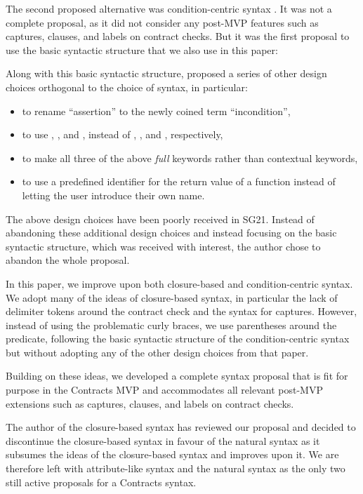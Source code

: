 The second proposed alternative was condition-centric syntax \cite{P2737R0}. It was not a complete proposal, as it did not consider any post-MVP features such as captures,  clauses, and labels on contract checks. But it was the first proposal to use the basic syntactic structure that we also use in this paper:

\phantom{~~~}

Along with this basic syntactic structure, \cite{P2737R0} proposed a series of other design choices orthogonal to the choice of syntax, in particular:
\begin{itemize}
\item to rename ``assertion'' to the newly coined term ``incondition'',
\item to use , , and , instead of , , and , respectively,
\item to make all three of the above \emph{full} keywords rather than contextual keywords,
\item to use a predefined identifier  for the return value of a function instead of letting the user introduce their own name.
\end{itemize}
The above design choices have been poorly received in SG21. Instead of abandoning these additional design choices and instead focusing on the basic syntactic structure, which was received with interest, the author chose to abandon the whole proposal.

In this paper, we improve upon both closure-based and condition-centric syntax. We adopt many of the ideas of closure-based syntax, in particular the lack of delimiter tokens around the contract check and the syntax for captures. However, instead of using the problematic curly braces, we use parentheses around the predicate, following the basic syntactic structure of the condition-centric syntax \cite{P2737R0} but without adopting any of the other design choices from that paper.

Building on these ideas, we developed a complete syntax proposal that is fit for purpose in the Contracts MVP and accommodates all relevant post-MVP extensions such as captures,  clauses, and labels on contract checks.

The author of the closure-based syntax has reviewed our proposal and decided to discontinue the closure-based syntax in favour of the natural syntax as it subsumes the ideas of the closure-based syntax and improves upon it. We are therefore left with attribute-like syntax and the natural syntax as the only two still active proposals for a Contracts syntax.


